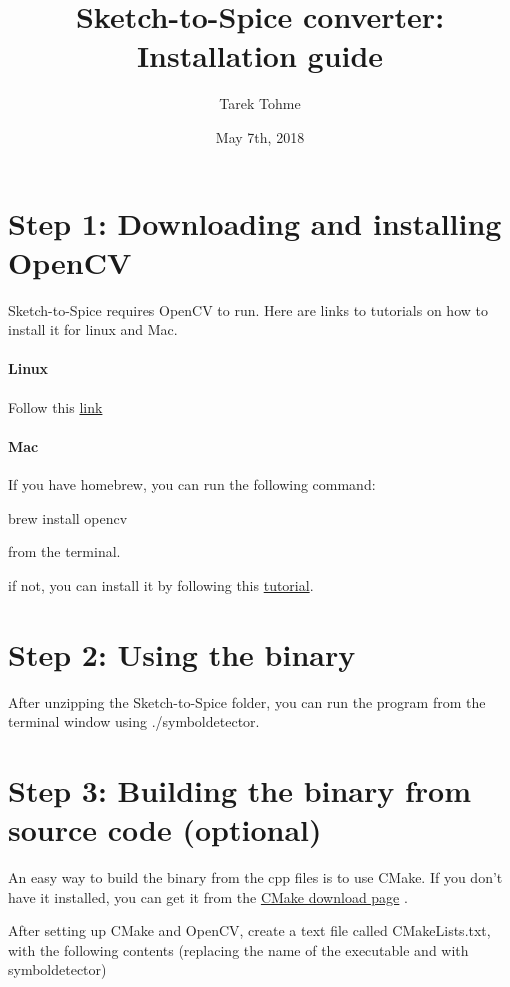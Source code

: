 \documentclass{article}
\begin{document}
\title{Sketch-to-Spice converter: Installation guide}
\author{Tarek Tohme}
\date{May 7th, 2018}
\maketitle


\section{Step 1: Downloading and installing OpenCV}
Sketch-to-Spice requires OpenCV to run. Here are links to tutorials on how to install it for linux and Mac.

\paragraph{Linux}
Follow this \href{https://docs.opencv.org/2.4/doc/tutorials/introduction/linux_install/linux_install.html}{\color{blue}link}

\paragraph{Mac}
If you have homebrew, you can run the following command:

brew install opencv

from the terminal.

if not, you can install it by following this \href{http://osxdaily.com/2018/03/07/how-install-homebrew-mac-os/}{\color{blue}tutorial}.

\section{Step 2: Using the binary}
After unzipping the Sketch-to-Spice folder, you can run the program from the terminal window
using ./symboldetector.

\section{Step 3: Building the binary from source code (optional)}
An easy way to build the binary from the cpp files is to use CMake. If you don't have it installed, you can get it from the \href{https://cmake.org/download/}{\color{blue}CMake download page} .

After setting up CMake and OpenCV, create a text file called CMakeLists.txt, with the following contents (replacing the name of the executable and with symboldetector)
\end{document}

